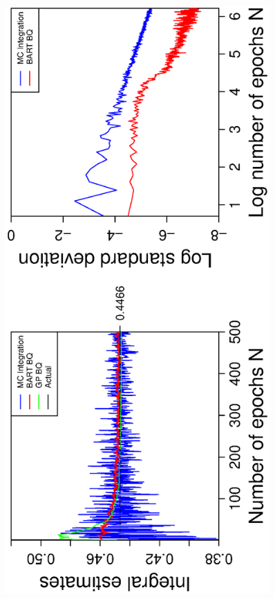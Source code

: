 \vspace{-0.5cm}
\begin{figure}[H]
  \centering
  \hspace{-1.6cm}
  \begin{minipage}[b]{0.4\textwidth}
    \includegraphics[width = 0.9\textwidth, angle = -90]{report/Figures/4/convergenceMean410Dimensions.eps}

\end{minipage}
\end{figure}
